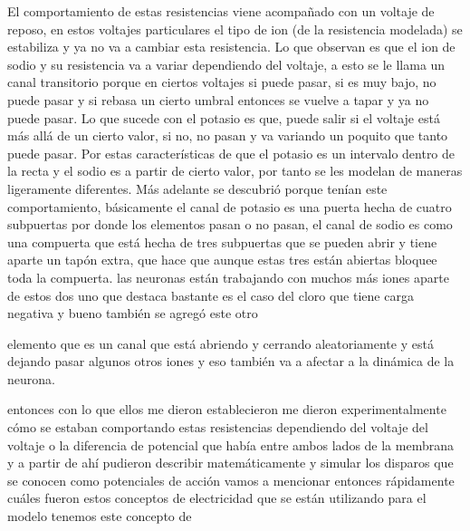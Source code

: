 El comportamiento de estas resistencias viene acompañado con un voltaje de reposo, en estos voltajes particulares el tipo de ion (de la resistencia modelada) se estabiliza y ya no va a cambiar esta resistencia. 
Lo que observan es que el ion de sodio y su resistencia va a variar dependiendo del voltaje, a esto se le llama un canal transitorio porque en ciertos voltajes si puede pasar, si es muy bajo, no puede pasar y si rebasa un cierto umbral entonces se vuelve a tapar y ya no puede pasar. 
Lo que sucede con el potasio es que, puede salir si el voltaje está más allá de un cierto valor, si no, no pasan y va variando un poquito que tanto puede pasar. Por estas características de que el potasio es un intervalo dentro de la recta y el sodio es a partir de cierto valor, por tanto se les modelan de maneras ligeramente diferentes. Más adelante se descubrió porque tenían este comportamiento, básicamente el canal de potasio es una puerta hecha de cuatro subpuertas por donde los elementos pasan o no pasan, el canal de sodio es como una compuerta que está hecha de tres subpuertas que se pueden abrir y tiene aparte un tapón extra, que hace que  aunque estas tres están abiertas bloquee toda la compuerta.
 las neuronas están trabajando con muchos más iones aparte de estos dos uno que destaca bastante es el caso del cloro que tiene carga negativa y bueno también se agregó este otro 
 
 elemento que es un canal que está abriendo y cerrando aleatoriamente y está dejando pasar algunos otros iones y eso también va a afectar a la dinámica de la neurona.

entonces con lo que ellos me dieron establecieron me dieron experimentalmente cómo se estaban comportando estas resistencias dependiendo del voltaje del voltaje o la diferencia de potencial que había entre ambos lados de la membrana y a partir de ahí pudieron describir matemáticamente y simular los disparos que se conocen como potenciales de acción 
vamos a mencionar entonces rápidamente cuáles fueron estos conceptos de electricidad que se están utilizando para el modelo tenemos este concepto de 


